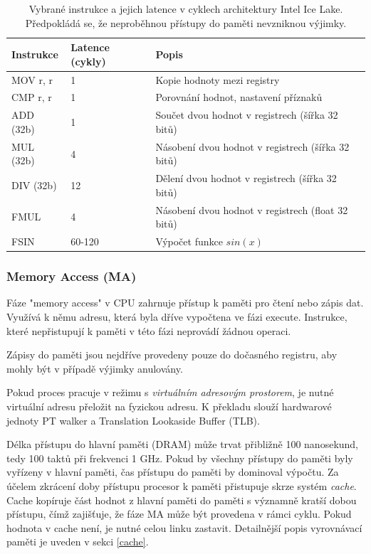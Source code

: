 \begin{table}[ht]
\centering
\caption{Vybrané instrukce a jejich latence v cyklech architektury Intel Ice Lake. Předpokládá se, že neproběhnou přístupy do paměti nevzniknou výjimky. \cite{instructionTables}}
\begin{tabular}{|l|l|l|}
\hline
Instrukce & Latence (cykly) & Popis                                                          \\ \hline\hline
MOV r, r  & 1       & Kopie hodnoty mezi registry                                    \\ \hline
CMP r, r  & 1       & Porovnání hodnot, nastavení příznaků                           \\ \hline
ADD (32b) & 1       & Součet dvou hodnot v registrech (šířka 32 bitů)                \\ \hline
MUL (32b) & 4       & Násobení dvou hodnot v registrech (šířka 32 bitů)              \\ \hline
DIV (32b) & 12      & Dělení dvou hodnot v registrech (šířka 32 bitů)                \\ \hline
FMUL      & 4       & Násobení dvou hodnot v registrech (float 32 bitů)   \\ \hline
FSIN      & 60-120  & Výpočet funkce $sin(x)$                                        \\ \hline
\end{tabular}
\label{table:ex_latency}
\end{table}

\subsubsection{Memory Access (MA)}

Fáze "memory access" v CPU zahrnuje přístup k paměti pro čtení nebo zápis dat.
Využívá k němu adresu, která byla dříve vypočtena ve fázi execute.
Instrukce, které nepřistupují k paměti v této fázi neprovádí žádnou operaci.

Zápisy do paměti jsou nejdříve provedeny pouze do dočasného registru, aby mohly být v případě výjimky anulovány.

Pokud proces pracuje v režimu s \emph{virtuálním adresovým prostorem}, je nutné virtuální adresu přeložit na fyzickou adresu.
K překladu slouží hardwarové jednoty PT walker a Translation Lookaside Buffer (TLB).

Délka přístupu do hlavní paměti (DRAM) může trvat přibližně 100 nanosekund, tedy 100 taktů při frekvenci 1 GHz.
Pokud by všechny přístupy do paměti byly vyřízeny v hlavní paměti, čas přístupu do paměti by dominoval výpočtu.
Za účelem zkrácení doby přístupu procesor k paměti přistupuje skrze systém \emph{cache}.
Cache kopíruje část hodnot z hlavní paměti do paměti s významně kratší dobou přístupu, čímž zajišťuje, že fáze MA může být provedena v rámci cyklu.
Pokud hodnota v cache není, je nutné celou linku zastavit.
Detailnější popis vyrovnávací paměti je uveden v sekci \ref{cache}.

